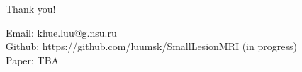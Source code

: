 \documentclass[10pt,aspectratio=169]{beamer}
\begin{document}
\begin{frame}[plain]
\centering
\vspace{1.5cm}

{\color{navy}Thank you!\par}

\vspace{0.5cm}

\vfill

{\small Email: khue.luu@g.nsu.ru \\ Github: https://github.com/luumsk/SmallLesionMRI (in progress) \\ Paper: TBA}

\end{frame}
\end{document}

